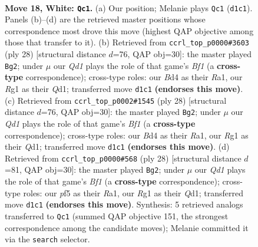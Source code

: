 \documentclass[11pt]{article}
\begin{document}
\clearpage

\begin{figure}[p]\centering
\begin{subfigure}{0.46\textwidth}\centering
\resizebox{\linewidth}{!}{%
\newchessgame
\chessboard[
  setfen={rnb1k1r1/1p6/3pq1p1/p4p1p/3B4/2N5/PPP2PPP/R2Q1KR1 w q - 1 18},
  showmover=false,
  pgfstyle=straightmove, color=movearrow, markmove={d1-c1}
]}
\caption{}
\end{subfigure}\hfill
\begin{subfigure}{0.46\textwidth}\centering
\resizebox{\linewidth}{!}{%
\newchessgame
\chessboard[
  setfen={rn2k2r/pb2qp2/2p1p3/1p6/2pPN3/6P1/PP3P1P/R2QKB1R w KQkq - 3 15},
  showmover=false,
  pgfstyle=straightmove, color=movearrow, markmove={f1-g2}
]}
\caption{}
\end{subfigure}
\\[4pt]
\begin{subfigure}{0.46\textwidth}\centering
\resizebox{\linewidth}{!}{%
\newchessgame
\chessboard[
  setfen={rn2k2r/pb2qp2/2p1p3/1p6/2pPN3/6P1/PP3P1P/R2QKB1R w KQkq - 3 15},
  showmover=false,
  pgfstyle=straightmove, color=movearrow, markmove={f1-g2}
]}
\caption{}
\end{subfigure}\hfill
\begin{subfigure}{0.46\textwidth}\centering
\resizebox{\linewidth}{!}{%
\newchessgame
\chessboard[
  setfen={r1b1k2r/p3qp2/n1p1p3/1p6/2pPN3/6P1/PP3P1P/R2QKB1R w KQkq - 3 15},
  showmover=false,
  pgfstyle=straightmove, color=movearrow, markmove={f1-g2}
]}
\caption{}
\end{subfigure}
\caption{\textbf{Move 18, White: \texttt{Qc1}.} (a) Our position; Melanie plays \texttt{Qc1} (\texttt{d1c1}). Panels (b)--(d) are the retrieved master positions whose correspondence most drove this move (highest QAP objective among those that transfer to it). (b) Retrieved from \texttt{ccrl\_top\_p0000\#3603} (ply 28) [structural distance $d$=76, QAP obj=30]: the master played \texttt{Bg2}; under $\mu$ our \emph{Qd1} plays the role of that game's \emph{Bf1} (a \textbf{cross-type} correspondence); cross-type roles: our \emph{B}d4 as their \emph{R}a1, our \emph{R}g1 as their \emph{Q}d1; transferred move \texttt{d1c1} \textbf{(endorses this move)}. (c) Retrieved from \texttt{ccrl\_top\_p0002\#1545} (ply 28) [structural distance $d$=76, QAP obj=30]: the master played \texttt{Bg2}; under $\mu$ our \emph{Qd1} plays the role of that game's \emph{Bf1} (a \textbf{cross-type} correspondence); cross-type roles: our \emph{B}d4 as their \emph{R}a1, our \emph{R}g1 as their \emph{Q}d1; transferred move \texttt{d1c1} \textbf{(endorses this move)}. (d) Retrieved from \texttt{ccrl\_top\_p0000\#568} (ply 28) [structural distance $d$=81, QAP obj=30]: the master played \texttt{Bg2}; under $\mu$ our \emph{Qd1} plays the role of that game's \emph{Bf1} (a \textbf{cross-type} correspondence); cross-type roles: our \emph{p}f5 as their \emph{R}a1, our \emph{R}g1 as their \emph{Q}d1; transferred move \texttt{d1c1} \textbf{(endorses this move)}. Synthesis: 5 retrieved analogs transferred to \texttt{Qc1} (summed QAP objective 151, the strongest correspondence among the candidate moves); Melanie committed it via the \texttt{search} selector.}
\label{fig:thought-m34}
\end{figure}
\end{document}
